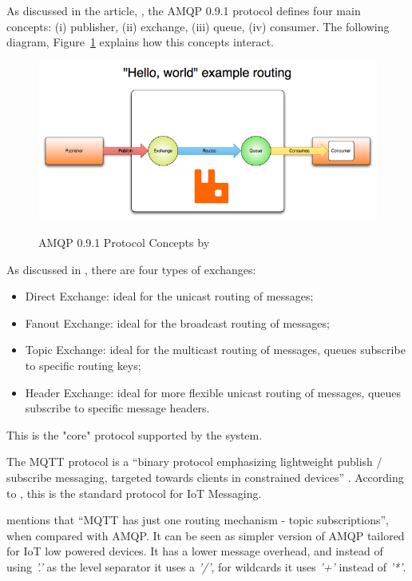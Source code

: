 As discussed in the article, , the \gls{AMQP} 0.9.1 protocol defines four main concepts: (i) publisher, (ii) exchange, (iii) queue, (iv) consumer. The following diagram, Figure~\ref{fig:implementation:decisions:rabbitmq} explains how this concepts interact.

\begin{figure}[H]
    \centering
    \resizebox{\columnwidth}{!}
    {
       \includegraphics{assets/figures/rabbitmq.png}
    }
    \caption[\gls{AMQP} 0.9.1 Protocol Concepts]{\gls{AMQP} 0.9.1 Protocol Concepts by \cite{rabbitmqexpl}}
    \label{fig:implementation:decisions:rabbitmq}
\end{figure}

As discussed in , there are four types of exchanges:

\begin{itemize}
    \item Direct Exchange: ideal for the unicast routing of messages;
    \item Fanout Exchange: ideal for the broadcast routing of messages;
    \item Topic Exchange: ideal for the multicast routing of messages, queues subscribe to specific routing keys;
    \item Header Exchange: ideal for more flexible unicast routing of messages, queues subscribe to specific message headers.
\end{itemize}

This is the "core" protocol supported by the system.

The \gls{MQTT} protocol is a ``binary protocol emphasizing lightweight publish / subscribe messaging, targeted towards clients in constrained devices'' \parencite{rabbitmq}. According to \cite{mqtt}, this is the standard protocol for \gls{IoT} Messaging.

\cite{mqtt-vs-amqp} mentions that ``\gls{MQTT} has just one routing mechanism - topic subscriptions'', when compared with \gls{AMQP}. It can be seen as simpler version of \gls{AMQP} tailored for \gls{IoT} low powered devices. It has a lower message overhead, and instead of using \textit{'.'} as the level separator it uses a \textit{'/'}, for wildcards it uses \textit{'+'} instead of \textit{'*'}. 

